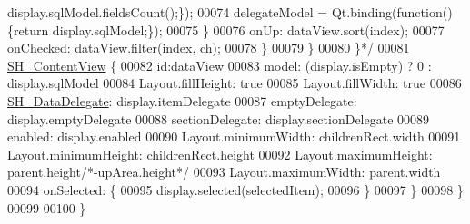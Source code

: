 \begin{DoxyCode}
{       display.sqlModel.fieldsCount();\});}
00074 \textcolor{comment}{                        delegateModel = Qt.binding(function() \{return display.sqlModel;\});}
00075 \textcolor{comment}{                    \}}
00076 \textcolor{comment}{                    onUp: dataView.sort(index);}
00077 \textcolor{comment}{                    onChecked: dataView.filter(index, ch);}
00078 \textcolor{comment}{                \}}
00079 \textcolor{comment}{            \}}
00080 \textcolor{comment}{        \}*/}
00081         \hyperlink{classSH__ContentView}{SH\_ContentView} \{
00082             \textcolor{keywordtype}{id}:dataView
00083             model: (display.isEmpty) ? 0 : display.sqlModel
00084             Layout.fillHeight: \textcolor{keyword}{true}
00085             Layout.fillWidth: \textcolor{keyword}{true}
00086             \hyperlink{classSH__DataDelegate}{SH\_DataDelegate}: display.itemDelegate
00087             emptyDelegate:  display.emptyDelegate
00088             sectionDelegate:  display.sectionDelegate
00089             enabled: display.enabled
00090             Layout.minimumWidth: childrenRect.width
00091             Layout.minimumHeight: childrenRect.height
00092             Layout.maximumHeight: parent.height\textcolor{comment}{/*-upArea.height*/}
00093             Layout.maximumWidth: parent.width
00094             onSelected: \{
00095                 display.selected(selectedItem);
00096             \}
00097         \}
00098     \}
00099 
00100 \}
\end{DoxyCode}
